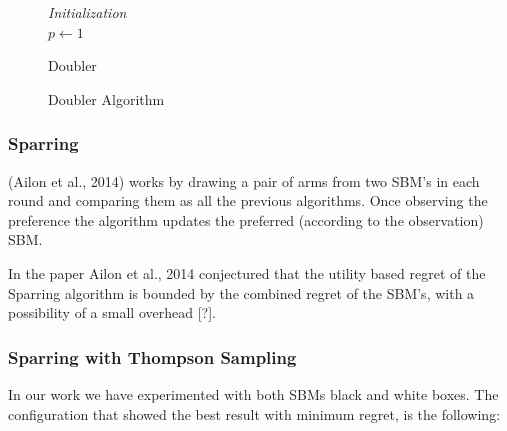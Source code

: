 \documentclass{llncs}
\begin{document}
	\begin{figure}[h]
	\IncMargin{1em}
		\begin{algorithm}[H]
		
		\BlankLine
		\emph{Initialization}\\
		$p\leftarrow 1$\\
			\caption{Doubler}
		\end{algorithm}
		\caption{Doubler Algorithm}\label{algo_Doubler}
	\end{figure}

\subsubsection{Sparring}
	(Ailon et al., 2014) works by drawing a pair of arms from two SBM's in each round and comparing them as all the previous algorithms. Once observing the preference the algorithm updates the preferred (according to the observation) SBM.  
	
		
	\begin{conjecture}
 		In the paper Ailon et al., 2014 conjectured that the utility based regret of the Sparring algorithm is bounded by the combined regret of the SBM's, with a possibility of a small overhead [?].
 	\end{conjecture}		
		
	\subsubsection{Sparring with Thompson Sampling}
		In our work  we have experimented with both SBMs black and white boxes. The configuration that showed the best result with minimum regret, is the following: 
		
		
	
\end{document}
